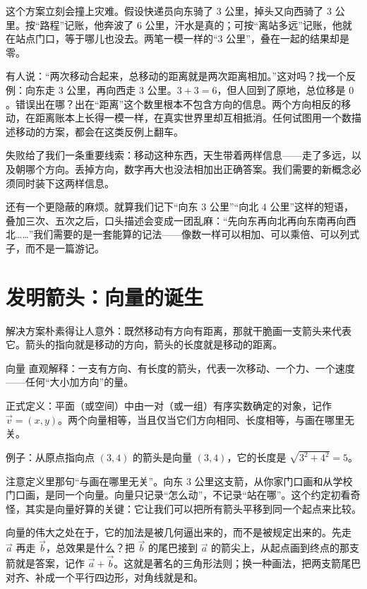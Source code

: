 这个方案立刻会撞上灾难。假设快递员向东骑了 $3$ 公里，掉头又向西骑了 $3$ 公里。按“路程”记账，他奔波了 $6$ 公里，汗水是真的；可按“离站多远”记账，他就在站点门口，等于哪儿也没去。两笔一模一样的“$3$ 公里”，叠在一起的结果却是零。

\begin{fanli}
有人说：“两次移动合起来，总移动的距离就是两次距离相加。”这对吗？找一个反例：向东走 $3$ 公里，再向西走 $3$ 公里。$3+3=6$，但人回到了原地，总位移是 $0$。错误出在哪？出在“距离”这个数里根本不包含方向的信息。两个方向相反的移动，在距离账本上长得一模一样，在真实世界里却互相抵消。任何试图用一个数描述移动的方案，都会在这类反例上翻车。
\end{fanli}

失败给了我们一条重要线索：移动这种东西，天生带着两样信息——走了多远，以及朝哪个方向。丢掉方向，数字再大也没法相加出正确答案。我们需要的新概念必须同时装下这两样信息。

还有一个更隐蔽的麻烦。就算我们记下“向东 $3$ 公里”“向北 $4$ 公里”这样的短语，叠加三次、五次之后，口头描述会变成一团乱麻：“先向东再向北再向东南再向西北……”我们需要的是一套能算的记法——像数一样可以相加、可以乘倍、可以列式子，而不是一篇游记。

\section{发明箭头：向量的诞生}

解决方案朴素得让人意外：既然移动有方向有距离，那就干脆画一支箭头来代表它。箭头的指向就是移动的方向，箭头的长度就是移动的距离。

\begin{shuyu}{向量}
直观解释：一支有方向、有长度的箭头，代表一次移动、一个力、一个速度——任何“大小加方向”的量。

正式定义：平面（或空间）中由一对（或一组）有序实数确定的对象，记作 $\vec{v}=(x,y)$。两个向量相等，当且仅当它们方向相同、长度相等，与画在哪里无关。

例子：从原点指向点 $(3,4)$ 的箭头是向量 $(3,4)$，它的长度是 $\sqrt{3^2+4^2}=5$。
\end{shuyu}

注意定义里那句“与画在哪里无关”。向东 $3$ 公里这支箭，从你家门口画和从学校门口画，是同一个向量。向量只记录“怎么动”，不记录“站在哪”。这个约定初看奇怪，其实是向量好算的关键：它让我们可以把所有箭头平移到同一个起点来比较。

向量的伟大之处在于，它的加法是被几何逼出来的，而不是被规定出来的。先走 $\vec{a}$ 再走 $\vec{b}$，总效果是什么？把 $\vec{b}$ 的尾巴接到 $\vec{a}$ 的箭尖上，从起点画到终点的那支箭就是答案，记作 $\vec{a}+\vec{b}$。这就是著名的三角形法则；换一种画法，把两支箭尾巴对齐、补成一个平行四边形，对角线就是和。

